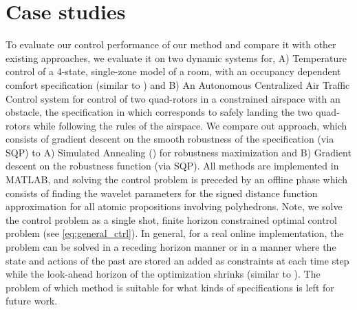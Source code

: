 \section{Case studies}
\label{sec:case study}

To evaluate our control performance of our method and compare it with other existing approaches, we evaluate it on two dynamic systems for, A) Temperature control of a 4-state, single-zone model of a room, with an occupancy dependent comfort specification (similar to \cite{Raman14_MPCSTL}) and B) An Autonomous Centralized Air Traffic Control system for control of two quad-rotors in a constrained airspace with an obstacle, the specification in which corresponds to safely landing the two quad-rotors while following the rules of the airspace. We compare out approach, which consists of gradient descent on the smooth robustness of the specification (via SQP) to A) Simulated Annealing (\cite{}) for robustness maximization and B) Gradient descent on the robustness function (via SQP). 
All methods are implemented in MATLAB, and solving the control problem is preceded by an offline phase which consists of finding the wavelet parameters for the signed distance function approximation for all atomic propositions involving polyhedrons. 
Note, we solve the control problem as a single shot, finite horizon constrained optimal control problem (see \eqref{eq:general_ctrl}). In general, for a real online implementation, the problem can be solved in a receding horizon manner or in a manner where the state and actions of the past are stored an added as constraints at each time step while the look-ahead horizon of the optimization shrinks (similar to \cite{Raman14_MPCSTL}). The problem of which method is suitable for what kinds of specifications is left for future work.


